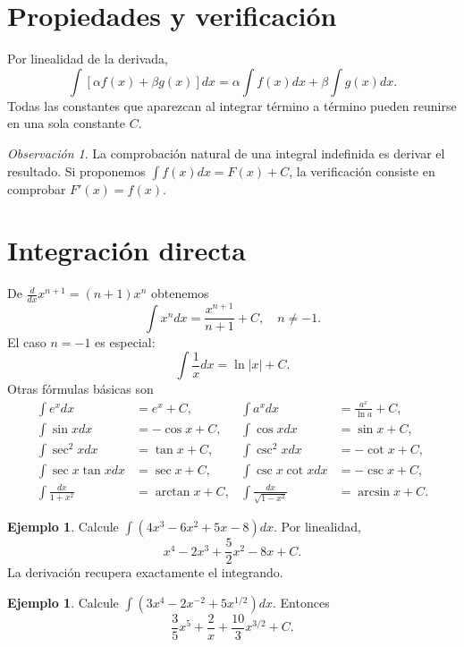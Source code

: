 \documentclass[12pt]{article}
\theoremstyle{definition}\newtheorem{definicion}[teorema]{Definición}\newtheorem{ejemplo}[teorema]{Ejemplo}\newtheorem{ejercicio}[teorema]{Ejercicio}
\theoremstyle{remark}\newtheorem*{observacion}{Observación}\newtheorem*{advertencia}{Advertencia}\newtheorem*{estrategia}{Estrategia}
\begin{document}
\section{Propiedades y verificación}
Por linealidad de la derivada,
\[\int[\alpha f(x)+\beta g(x)]dx=\alpha\int f(x)dx+\beta\int g(x)dx.\]
Todas las constantes que aparezcan al integrar término a término pueden reunirse en una sola constante $C$.
\begin{observacion}La comprobación natural de una integral indefinida es derivar el resultado. Si proponemos $\int f(x)dx=F(x)+C$, la verificación consiste en comprobar $F'(x)=f(x)$.\end{observacion}

\section{Integración directa}
De $\frac{d}{dx}x^{n+1}=(n+1)x^n$ obtenemos
\[\boxed{\int x^n dx=\frac{x^{n+1}}{n+1}+C,\quad n\neq-1}.\]
El caso $n=-1$ es especial:
\[\boxed{\int\frac1x dx=\ln|x|+C}.\]
Otras fórmulas básicas son
\begin{align*}
\int e^x dx&=e^x+C,& \int a^x dx&=\frac{a^x}{\ln a}+C,\\
\int\sin xdx&=-\cos x+C,&\int\cos xdx&=\sin x+C,\\
\int\sec^2x dx&=\tan x+C,&\int\csc^2x dx&=-\cot x+C,\\
\int\sec x\tan xdx&=\sec x+C,&\int\csc x\cot xdx&=-\csc x+C,\\
\int\frac{dx}{1+x^2}&=\arctan x+C,&\int\frac{dx}{\sqrt{1-x^2}}&=\arcsin x+C.
\end{align*}
\begin{ejemplo}Calcule $\int(4x^3-6x^2+5x-8)dx$. Por linealidad,
\[x^4-2x^3+\frac52x^2-8x+C.\]
La derivación recupera exactamente el integrando.\end{ejemplo}
\begin{ejemplo}Calcule $\int(3x^4-2x^{-2}+5x^{1/2})dx$. Entonces
\[\boxed{\frac35x^5+\frac2x+\frac{10}{3}x^{3/2}+C}.\]\end{ejemplo}
\end{document}

